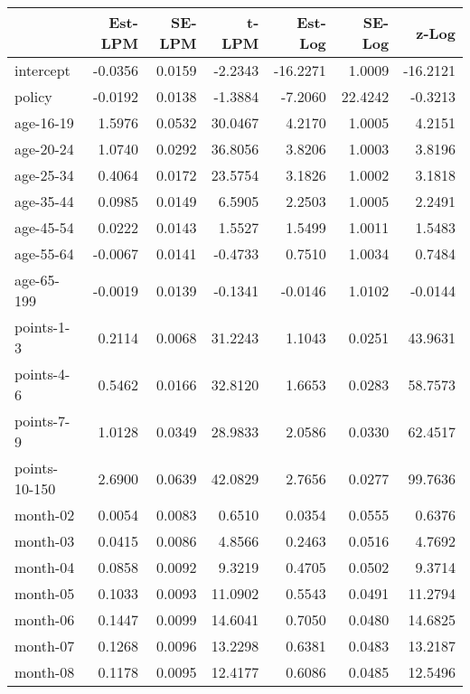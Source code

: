 \documentclass[10pt]{article}
\begin{document}

\begin{table}[ht]
\centering
\begin{tabular}{lrrrrrr}
  \hline
 & Est-LPM & SE-LPM & t-LPM & Est-Log & SE-Log & z-Log \\ 
  \hline
intercept & -0.0356 & 0.0159 & -2.2343 & -16.2271 & 1.0009 & -16.2121 \\ 
  policy & -0.0192 & 0.0138 & -1.3884 & -7.2060 & 22.4242 & -0.3213 \\ 
  age-16-19 & 1.5976 & 0.0532 & 30.0467 & 4.2170 & 1.0005 & 4.2151 \\ 
  age-20-24 & 1.0740 & 0.0292 & 36.8056 & 3.8206 & 1.0003 & 3.8196 \\ 
  age-25-34 & 0.4064 & 0.0172 & 23.5754 & 3.1826 & 1.0002 & 3.1818 \\ 
  age-35-44 & 0.0985 & 0.0149 & 6.5905 & 2.2503 & 1.0005 & 2.2491 \\ 
  age-45-54 & 0.0222 & 0.0143 & 1.5527 & 1.5499 & 1.0011 & 1.5483 \\ 
  age-55-64 & -0.0067 & 0.0141 & -0.4733 & 0.7510 & 1.0034 & 0.7484 \\ 
  age-65-199 & -0.0019 & 0.0139 & -0.1341 & -0.0146 & 1.0102 & -0.0144 \\ 
  points-1-3 & 0.2114 & 0.0068 & 31.2243 & 1.1043 & 0.0251 & 43.9631 \\ 
  points-4-6 & 0.5462 & 0.0166 & 32.8120 & 1.6653 & 0.0283 & 58.7573 \\ 
  points-7-9 & 1.0128 & 0.0349 & 28.9833 & 2.0586 & 0.0330 & 62.4517 \\ 
  points-10-150 & 2.6900 & 0.0639 & 42.0829 & 2.7656 & 0.0277 & 99.7636 \\ 
  month-02 & 0.0054 & 0.0083 & 0.6510 & 0.0354 & 0.0555 & 0.6376 \\ 
  month-03 & 0.0415 & 0.0086 & 4.8566 & 0.2463 & 0.0516 & 4.7692 \\ 
  month-04 & 0.0858 & 0.0092 & 9.3219 & 0.4705 & 0.0502 & 9.3714 \\ 
  month-05 & 0.1033 & 0.0093 & 11.0902 & 0.5543 & 0.0491 & 11.2794 \\ 
  month-06 & 0.1447 & 0.0099 & 14.6041 & 0.7050 & 0.0480 & 14.6825 \\ 
  month-07 & 0.1268 & 0.0096 & 13.2298 & 0.6381 & 0.0483 & 13.2187 \\ 
  month-08 & 0.1178 & 0.0095 & 12.4177 & 0.6086 & 0.0485 & 12.5496 \\ 

\end{tabular}
\end{table}
\end{document}
